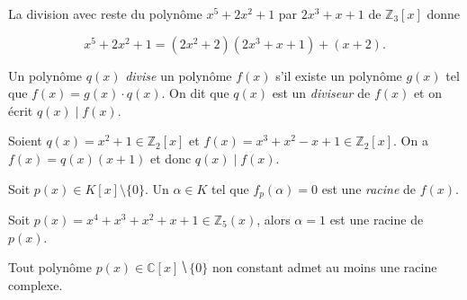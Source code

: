 

\begin{example}
  \label{exe:24}
  La division avec reste du polynôme $x^5+2x^2+1$ par $2x^3+x+1$ de $ℤ_3[x]$ donne

  \begin{displaymath}
    x^5+2x^2+1 = (2x^2 +2) (2x^3 + x +1) + (x+2). 
  \end{displaymath}
  
\end{example}






\begin{definition}
  \label{def:32}
  Un polynôme  $q(x)$ \emph{divise} un  polynôme $f(x)$ s'il existe un polynôme $g(x)$ tel que $f(x) = g(x) \cdot q(x)$. On dit que $q(x)$ est un \emph{diviseur} de $f(x)$ et on écrit $q(x) \mid f(x)$. 
\end{definition}


\begin{example}
  \label{exe:41}
  Soient $q(x) = x^2 +1 ∈ℤ_2[x]$ et $ f(x) = x^3 + x^2 - x+1 ∈ ℤ_2[x]$. On a
  $f(x) = q(x) (x+1)$ et donc 
   $q(x) \mid f(x)$. 
\end{example}


\begin{definition}
  \label{def:31}
  Soit $p(x) \in K[x] \setminus\{0\}$. Un $\alpha \in K$ tel que $f_p(\alpha) = 0$ est une  \emph{racine} de $f(x)$.  
\end{definition}


\begin{example}
  \label{exe:40}
  Soit $p(x) = x^4 + x^3 + x^2 + x + 1 ∈ ℤ_5(x)$, alors $α = 1$ est une racine de $p(x)$. 
\end{example}


\begin{theorem}
  \label{thr:44}
  Tout polynôme $p(x) ∈ℂ[x] ⧹\{0\}$ non constant admet au moins une racine complexe.
\end{theorem}




